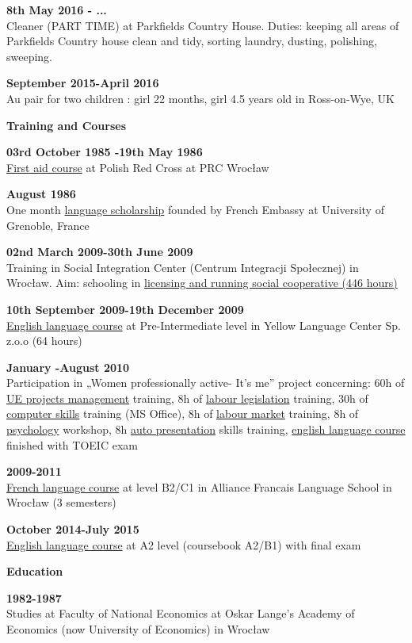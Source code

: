 \documentclass[a4paper,12pt,final]{memoir}
\newcommand{\SmallSep}{\vspace{0.5em}}
\newenvironment{Career Profile}
	{\ignorespaces\textbf{\color{ForestGreen} Career Profile}}
	{\Sep\ignorespacesafterend}
\newenvironment{Key experience}
	{\ignorespaces\textbf{\color{ForestGreen} Key experience}}
	{\Sep\ignorespacesafterend}
\newcommand{\CVSection}[1]
	{\Large\textbf{#1}\par
	\SmallSep\normalsize\normalfont}
\newcommand{\CVItem}[1]
	{\textbf{\color{ForestGreen} #1}}
\begin{document}
\CVItem{ 8th May 2016 - ...}\\
Cleaner (PART TIME) at Parkfields Country House. Duties: keeping all areas of Parkfields Country house clean and tidy, sorting laundry, dusting, polishing, sweeping.
\SmallSep


\CVItem{September 2015-April 2016}\\
Au pair for two children : girl 22 months, girl 4.5 years old in Ross-on-Wye, UK
\SmallSep

\CVSection{Training and Courses}
\CVItem{ 03rd October 1985 -19th May 1986}\\
\underline{First aid course} at Polish Red Cross at PRC Wrocław
\SmallSep

\CVItem{August 1986}\\
One month \underline{language scholarship} founded by French Embassy at University of Grenoble, France
\SmallSep

\CVItem{02nd March 2009-30th June 2009	}\\
Training in Social Integration Center (Centrum Integracji Społecznej) in 	Wrocław. Aim: schooling in \underline{licensing and running social cooperative (446 hours)}
\SmallSep

\CVItem{10th September 2009-19th December 2009}\\
\underline{English language course} at Pre-Intermediate level in Yellow Language Center 	Sp. z.o.o  (64 hours)
\SmallSep

\CVItem{January -August 2010 }\\
Participation in „Women professionally active- It's me” project concerning: 60h of \underline{UE projects management} training, 8h of \underline{labour legislation} training, 30h of \underline{computer skills} training (MS Office), 8h of \underline{labour market} training, 8h of \underline{psychology} workshop, 8h \underline{auto presentation} skills training,  \underline{english language course} finished with TOEIC exam
\SmallSep

\CVItem{2009-2011}\\
\underline{French language course} at level B2/C1 in Alliance Francais Language School in Wrocław (3 semesters)
\SmallSep

\CVItem{October 2014-July 2015}\\
\underline{English language course} at A2 level (coursebook A2/B1)
with final exam
\SmallSep

\CVSection{Education}
\CVItem{1982-1987}\\
Studies at Faculty of National Economics at Oskar Lange's Academy of Economics (now University of Economics) in Wrocław
\SmallSep
\end{document}

